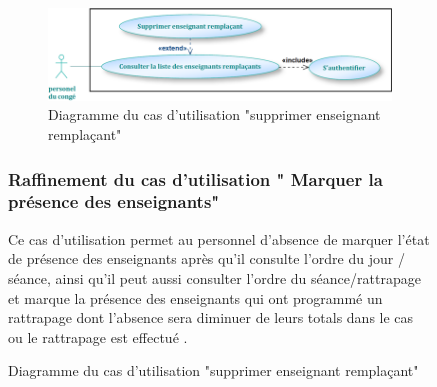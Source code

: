 \documentclass[12 pt]{report}
\begin{document}
\begin{figure}[h]
\begin{center}
\begin{figure}[h]
 \begin{center}
\includegraphics[width=13 cm ,height= 4 cm]{sup_ens_remp.PNG}
\caption{Diagramme du cas d’utilisation "supprimer enseignant remplaçant"}
\end{center}
\end{figure}
\subsubsection{Raffinement du cas d'utilisation " Marquer la présence des enseignants"}
Ce cas d'utilisation permet au personnel d'absence de marquer l'état 
de présence des enseignants après qu'il consulte l'ordre du jour / séance, ainsi qu'il  peut aussi consulter l'ordre du séance/rattrapage 
et marque la présence des enseignants qui ont programmé un rattrapage dont l'absence  sera diminuer  de leurs totals dans  le cas ou le rattrapage est effectué .\\


\end{center}
\end{figure}
\end{document}
